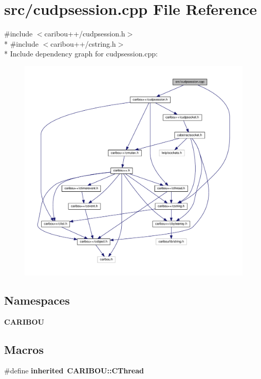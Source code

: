 \section{src/cudpsession.cpp File Reference}
\label{cudpsession_8cpp}
{\ttfamily \#include $<$caribou++/cudpsession.\-h$>$}\\*
{\ttfamily \#include $<$caribou++/cstring.\-h$>$}\\*
Include dependency graph for cudpsession.\-cpp\-:\nopagebreak
\begin{figure}[H]
\begin{center}
\leavevmode
\includegraphics[width=350pt]{cudpsession_8cpp__incl}
\end{center}
\end{figure}
\subsection*{Namespaces}
\begin{DoxyCompactItemize}
\item 
{\bf C\-A\-R\-I\-B\-O\-U}
\end{DoxyCompactItemize}
\subsection*{Macros}
\begin{DoxyCompactItemize}
\item 
\#define {\bf inherited}~{\bf C\-A\-R\-I\-B\-O\-U\-::\-C\-Thread}
\end{DoxyCompactItemize}


